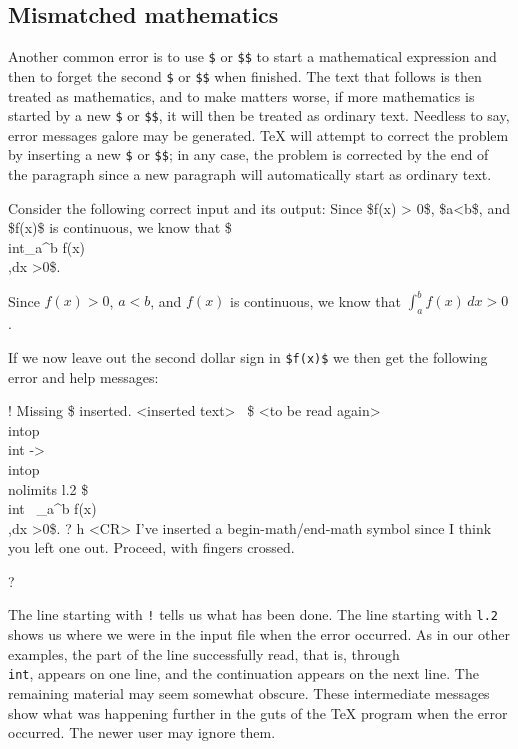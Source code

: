 \subsection{Mismatched mathematics} 
 
Another common error is to use {\tt \$} or {\tt \$\$} to start a 
mathematical expression and then to forget the second {\tt \$} 
or {\tt \$\$} when finished.  The text that follows is then 
treated as mathematics, and to make matters worse, if more 
mathematics is started by a new {\tt \$} or {\tt \$\$}, it will 
then be treated as ordinary text.  Needless to say, error 
messages galore may be generated. \TeX{} will attempt to correct 
the problem by inserting a new {\tt \$} or {\tt \$\$}; in any 
case, the problem is corrected by the end of the paragraph since 
a new paragraph will automatically start as ordinary text. 
 
Consider the following correct input and its output: 
\beginuser 
Since \$f(x) > 0\$, \$a<b\$,  and \$f(x)\$ is continuous, we know that 
\$\\int\_{}a\^{}b f(x)\\,dx >0\$. 
\enduser 
 
Since $f(x) > 0$, $a<b$,  and $f(x)$ is continuous, we know that 
$\int_a^b f(x)\,dx >0$. 
 
If we now leave out the second dollar sign in {\tt \$f(x)\$} we 
then get the following error and help messages: 
 
\beginuser \obeyspaces 
! Missing \$ inserted. 
<inserted text> 
\               \$ 
<to be read again> 
\                  \\intop 
\\int ->\\intop 
\             \\nolimits 
l.2 \$\\int 
\          \_{}a\^{}b f(x)\\,dx >0\$. 
? h <CR> 
I've inserted a begin-math/end-math symbol since I think 
you left one out. Proceed, with fingers crossed. 
 
? 
\enduser 
 
The line starting with {\tt !} tells us what has been done. The 
line starting with {\tt l.2} shows us where we were in the input 
file when the error occurred.  As in our other examples, the part 
of the line successfully read, that is, through {\tt \\int}, 
appears on one line, and the continuation appears on the next 
line. The remaining material may seem somewhat obscure.  These 
intermediate messages show what was happening further in the guts 
of the \TeX{} program when the error occurred.  The newer user 
may ignore them. 
 
